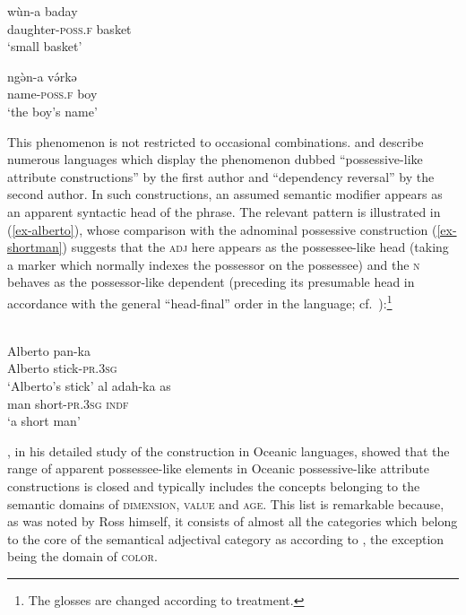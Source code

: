 \documentclass[output=paper,nobabel,draftmode  ,colorlinks, citecolor=brown]{langscibook}
\begin{document}
\ea
{}
\ea\label{ex-smallbasket} 
\gll wùn-a	baday \\ daughter-\textsc{poss.f}	basket \\
\glt `small basket' \citep[54, 258]{Schuh1998}

\ex\label{ex-boysname}
\gll ngə̀n-a	          və́rkə \\ 
     name-\textsc{poss.f} boy \\ 
\glt `the boy's name' \citep[249]{Schuh1998}
\z
\z

\noindent
This phenomenon is not restricted to occasional combinations. 
\citet{Ross1998} and \citet{Malchukov2000} describe numerous languages which display the phenomenon
dubbed ``possessive-like attribute constructions'' by the first author and ``dependency reversal''
by the second author. In such constructions, an assumed semantic modifier appears as an apparent
syntactic head of the phrase. The relevant pattern is illustrated in (\ref{ex-alberto}), whose
comparison with the adnominal possessive construction (\ref{ex-shortman}) suggests that the
\textsc{adj} here appears as the possessee-like head (taking a marker which normally indexes the
possessor on the possessee) and the \textsc{n} behaves as the possessor-like dependent (preceding its
presumable head in accordance with the general ``head-final'' order in the language;
cf.\ \citet*[69--70]{Green1999}):\footnote{The glosses are changed according to  treatment.}

\ea
{}\\
\ea\label{ex-alberto}
\gll Alberto pan-ka \\ Alberto stick-\textsc{pr.3sg} \\
\glt `Alberto's stick'
\ex\label{ex-shortman}
\gll al	 adah-ka as \\ 
     man short-\textsc{pr.3sg} \textsc{indf} \\
\glt `a short man'
\z\z

\noindent
\citet{Ross1998}, in his detailed study of the construction in Oceanic languages, showed that the
range of apparent possessee-like elements in Oceanic possessive-like attribute constructions is
closed and typically includes the concepts belonging to the semantic domains of \textsc{dimension},
\textsc{value} and \textsc{age}. This list is remarkable because, as was noted by Ross himself, it
consists of almost all the categories which belong to the core of the semantical adjectival category
as according to \citet{Dixon1979}, the exception being the domain of \textsc{color}. 
\end{document}
